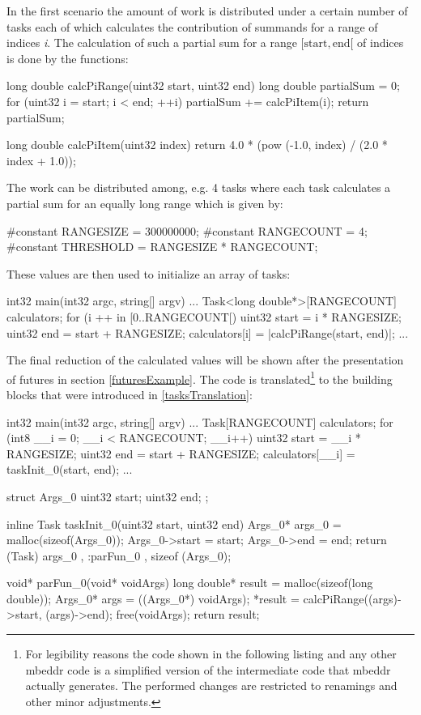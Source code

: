 In the first scenario the amount of work is distributed under a certain number of tasks each of which calculates the contribution of summands for a range of indices \textit{i}. The calculation of such a partial sum for a range $[\mathrm{start}, \mathrm{end}[$ of indices is done by the functions:
\begin{ccode}
long double calcPiRange(uint32 start, uint32 end) { 
  long double partialSum = 0; 
  for (uint32 i = start; i < end; ++i) { 
    partialSum += calcPiItem(i); 
  }
  return partialSum; 
}
 
long double calcPiItem(uint32 index) { 
  return 4.0 * (pow (-1.0, index) / (2.0 * index + 1.0)); 
}
\end{ccode}
The work can be distributed among, e.g. 4 tasks where each task calculates a partial sum for an equally long range which is given by:
\begin{ccode}
#constant RANGESIZE = 300000000;
#constant RANGECOUNT = 4; 
#constant THRESHOLD = RANGESIZE * RANGECOUNT;
\end{ccode}
These values are then used to initialize an array of tasks:
\begin{ccode}
int32 main(int32 argc, string[] argv) {
...
  Task<long double*>[RANGECOUNT] calculators;
  for (i ++ in [0..RANGECOUNT[) { 
    uint32 start = i * RANGESIZE; 
    uint32 end = start + RANGESIZE; 
    calculators[i] = |calcPiRange(start, end)|; 
  }
...
}
\end{ccode}
The final reduction of the calculated values will be shown after the presentation of futures in section \ref{futuresExample}. The code is translated\footnote{For legibility reasons the code shown in the following listing and any other mbeddr code is a simplified version of the intermediate code that mbeddr actually generates. The performed changes are restricted to renamings and other minor adjustments.} to the building blocks that were introduced in \ref{tasksTranslation}:
\begin{ccode}

int32 main(int32 argc, string[] argv) {
...
  Task[RANGECOUNT] calculators;
  for (int8 __i = 0; __i < RANGECOUNT; __i++) { 
    uint32 start = __i * RANGESIZE; 
    uint32 end = start + RANGESIZE; 
    calculators[__i] = taskInit_0(start, end); 
  }
...
}

struct Args_0 { 
  uint32 start; 
  uint32 end; 
};

inline Task taskInit_0(uint32 start, uint32 end) { 
  Args_0* args_0 = malloc(sizeof(Args_0)); 
  Args_0->start = start; 
  Args_0->end = end; 
  return (Task){ args_0 , :parFun_0 , sizeof (Args_0)}; 
}

void* parFun_0(void* voidArgs) { 
  long double* result = malloc(sizeof(long double)); 
  Args_0* args = ((Args_0*) voidArgs); 
  *result = calcPiRange((args)->start, (args)->end); 
  free(voidArgs); 
  return result; 
}
\end{ccode}
